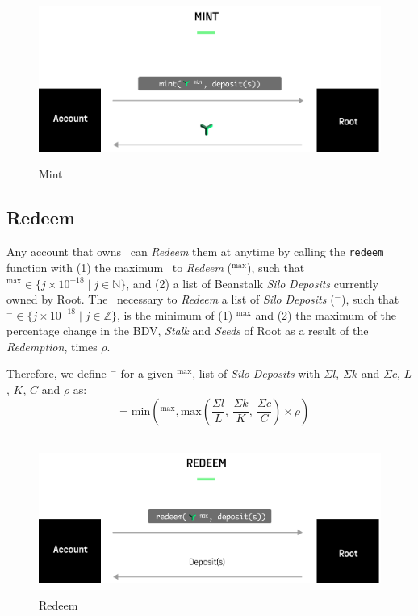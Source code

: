 \documentclass[tikz]{article}
\newcommand{\code}[1]{\texttt{#1}}
\newcommand{\term}[1]{\textsl{#1}}
\newcommand{\Root}{} %
\begin{document}
\begin{figure}[h!]
    \centering
    \hbox{\hspace{6em} \includegraphics[scale=1]{Figure1}}
    \caption{Mint}
    \label{fig 1}
\end{figure}

\newpage
\subsection{Redeem}
Any account that owns \Root\ can \term{Redeem} them at anytime by calling the \code{redeem} function with (1) the maximum \Root\ to \term{Redeem} ($\Root^{\text{max}}$), such that $\Root^{\text{max}} \in \{j \times 10^{-18} \mid j \in \mathbb{N}\}$, and (2) a list of Beanstalk \term{Silo} \term{Deposits} currently owned by Root. The \Root\ necessary to \term{Redeem} a list of \term{Silo} \term{Deposits} ($\Root^{-}$), such that $\Root^{-} \in \{j \times 10^{-18} \mid j \in \mathbb{Z}\}$, is the minimum of (1) $\Root^{\text{max}}$ and (2) the maximum of the percentage change in the BDV, \term{Stalk} and \term{Seeds} of Root as a result of the \term{Redemption}, times $\rho$. 

Therefore, we define $\Root^{-}$ for a given $\Root^{\text{max}}$, list of \term{Silo} \term{Deposits} with $\Sigma l$, $\Sigma k$ and $\Sigma c$, $L$, $K$, $C$ and $\rho$ as:
$$\Root^{-} = \text{min}\left(\Root^{\text{max}}, \text{max}\left(\frac{\Sigma l}{L},\ \frac{\Sigma k}{K},\ \frac{\Sigma c}{C}\right) \times \rho\right)$$

\begin{figure}[h!]
    \centering
    \hbox{\hspace{6em} \includegraphics[scale=1]{Figure2}}
    \caption{Redeem}
    \label{fig 2}
\end{figure}
\end{document}
